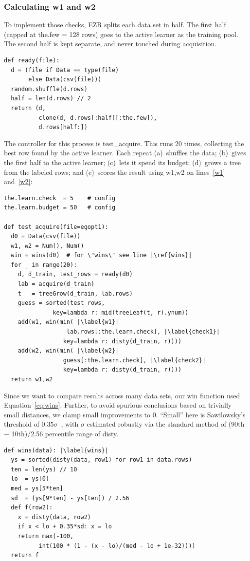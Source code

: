 \documentclass[AMA,STIX2COL]{WileyNJDv5}
\begin{document}
\subsubsection{Calculating \textsf{w1} and \textsf{w2}}
To implement those checks, EZR splits each data set in half.
The first half (capped at \textsf{the.few} = 128 rows) goes to
the active learner as the training pool. The second half is
kept separate, and never touched during acquisition.
\begin{verbatim}
def ready(file):
  d = (file if Data == type(file)
       else Data(csv(file)))
  random.shuffle(d.rows)
  half = len(d.rows) // 2
  return (d, 
          clone(d, d.rows[:half][:the.few]),
          d.rows[half:])
\end{verbatim}
The controller for this process is \textsf{test\_acquire}. This runs 
20 times, collecting the best row found by the active learner. Each 
repeat (a)~shuffles the data; (b)~gives the first half to the active 
learner; (c)~lets it spend its budget; (d)~grows a tree from the 
labeled rows; and (e)~scores the result using \textsf{w1,w2}  on lines~\ref{w1} 
and~\ref{w2}:
\begin{verbatim}
the.learn.check  = 5    # config
the.learn.budget = 50   # config

def test_acquire(file=egopt1):
  d0 = Data(csv(file))
  w1, w2 = Num(), Num()
  win = wins(d0)  # for \"wins\" see line |\ref{wins}|
  for _ in range(20):
    d, d_train, test_rows = ready(d0)
    lab = acquire(d_train)
    t   = treeGrow(d_train, lab.rows)
    guess = sorted(test_rows,
              key=lambda r: mid(treeLeaf(t, r).ynum))
    add(w1, win(min( |\label{w1}|
                  lab.rows[:the.learn.check], |\label{check1}|
                 key=lambda r: disty(d_train, r))))
    add(w2, win(min( |\label{w2}|
                 guess[:the.learn.check], |\label{check2}|
                 key=lambda r: disty(d_train, r))))
  return w1,w2
\end{verbatim}

Since we want to compare results across
many data sets,
our \textsf{win} function used
Equation~\ref{eq:wins}. Further,
to avoid spurious conclusions based on trivially
small distances, we
clamp small improvements to 0. ``Small'' here is Sawilowsky's
threshold of $0.35\sigma$~\cite{sawilowsky2009new}, with $\sigma$
estimated robustly via  the standard method of   (90th $-$ 10th)/2.56 percentile range
of \textsf{disty}.
\begin{verbatim}
def wins(data): |\label{wins}| 
  ys = sorted(disty(data, row1) for row1 in data.rows)
  ten = len(ys) // 10
  lo  = ys[0]
  med = ys[5*ten]
  sd  = (ys[9*ten] - ys[ten]) / 2.56
  def f(row2):
    x = disty(data, row2)
    if x < lo + 0.35*sd: x = lo
    return max(-100,
          int(100 * (1 - (x - lo)/(med - lo + 1e-32))))
  return f
\end{verbatim}
\end{document}
